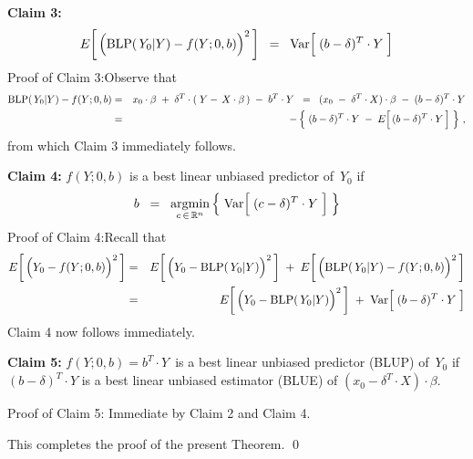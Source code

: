 \vskip 0.5cm
\noindent
\textbf{Claim 3:}
\begin{equation*}
E\!\left[\,\left(\blp(\,Y_{0}\vert Y) \overset{{\color{white}.}}{-} f(Y;0,b)\right)^{2}\,\right]
\;\; = \;\;
	\Var\!\left[\;(b \overset{{\color{white}.}}{-} \delta)^{T}\cdot Y\;\right]
\end{equation*}
Proof of Claim 3:\quad Observe that
\begin{eqnarray*}
\blp(\,Y_{0}\vert Y) - f(Y;0,b)
&=&
	x_{0}\cdot\beta \; + \; \delta^{T}\cdot(\;Y - \,X\cdot\beta\,) \; - \; b^{T} \cdot Y
\;\; = \;\;
	(x_{0} \; - \; \delta^{T} \cdot X) \cdot \beta \; - \; (b - \delta)^{T} \cdot Y
\\
&=&
	- \left\{\;
		(b - \delta)^{T} \cdot Y \; - \; E\!\left[\,(b \overset{{\color{white}.}}{-} \delta)^{T} \cdot Y\,\right]
		 \;\right\}\,,
\end{eqnarray*}
from which Claim 3 immediately follows.

\vskip 0.5cm
\noindent
\textbf{Claim 4:}\quad
$f(Y;0,b)$ is a best linear unbiased predictor of \,$Y_{0}$ if
\begin{equation*}
b \;\; = \;\;
	\underset{c\,\in\,\Re^{n}}{\textnormal{argmin}}
	\left\{\;
		\Var\!\left[\;(c \overset{{\color{white}.}}{-} \delta)^{T}\cdot Y\;\right]
		\;\right\}
\end{equation*}
Proof of Claim 4:\quad Recall that
\begin{eqnarray*}
E\!\left[\,\left(Y_{0} \overset{{\color{white}.}}{-} f(Y;0,b)\right)^{2}\,\right]
& = &
	E\!\left[\,\left(Y_{0} \overset{{\color{white}.}}{-} \blp(\,Y_{0}\vert Y)\right)^{2}\,\right]
	\; + \;
	E\!\left[\,\left(\blp(\,Y_{0}\vert Y) \overset{{\color{white}.}}{-} f(Y;0,b)\right)^{2}\,\right]
\\
& = &
	E\!\left[\,\left(Y_{0} \overset{{\color{white}.}}{-} \blp(\,Y_{0}\vert Y)\right)^{2}\,\right]
	\; + \;
	\Var\!\left[\;(b \overset{{\color{white}.}}{-} \delta)^{T}\cdot Y\;\right]
\end{eqnarray*}
Claim 4 now follows immediately.

\vskip 0.5cm
\noindent
\textbf{Claim 5:}\quad
$f(Y;0,b) = b^{T}\cdot Y$\, is a best linear unbiased predictor (BLUP) of \,$Y_{0}$ if
$(b-\delta)^{T} \cdot Y$ is a best linear unbiased estimator (BLUE) of
$(x_{0} - \delta^{T}\cdot X) \cdot \beta$.

\vskip 0.2cm
\noindent
Proof of Claim 5: \quad Immediate by Claim 2 and Claim 4.

\vskip 0.5cm
\noindent
This completes the proof of the present Theorem.
\qed


\renewcommand{\theenumi}{\roman{enumi}}
\renewcommand{\labelenumi}{\textnormal{(\theenumi)}$\;\;$}

